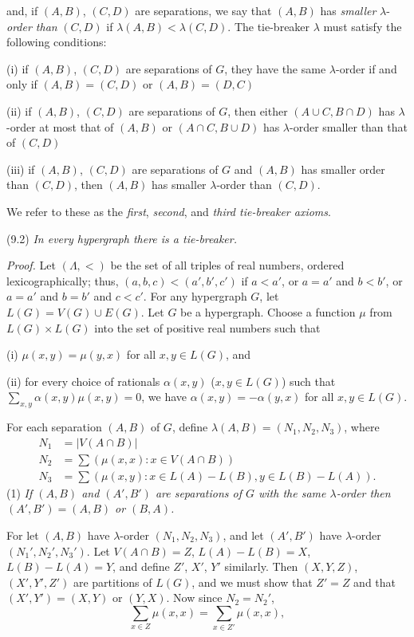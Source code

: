\noindent and, if $(A, B)$, $(C, D)$ are separations, we say that $(A, B)$ has \textit{smaller} $\lambda$-\textit{order than} $(C, D)$ if $\lambda(A, B) < \lambda(C, D)$. The tie-breaker $\lambda$ must satisfy the following conditions:

\hspace*{12pt}(i) if $(A, B)$, $(C, D)$ are separations of $G$, they have the same $\lambda$-order if and only if $(A, B) = (C, D)$ or $(A, B) = (D, C)$

\hspace*{12pt}(ii) if $(A, B)$, $(C, D)$ are separations of $G$, then either $(A \cup C, B \cap D)$ has $\lambda$-order at most that of $(A, B)$ or $(A \cap C, B \cup D)$ has $\lambda$-order smaller than that of $(C, D)$

\hspace*{12pt}(iii) if $(A, B)$, $(C, D)$ are separations of $G$ and $(A, B)$ has smaller order than $(C, D)$, then $(A, B)$ has smaller $\lambda$-order than $(C, D)$.

We refer to these as the \textit{first}, \textit{second}, and \textit{third tie-breaker axioms}.

\stmt
(9.2) \textit{In every hypergraph there is a tie-breaker.}

\textit{Proof.} Let $(\Lambda, <)$ be the set of all triples of real numbers, ordered lexicographically; thus, $(a, b, c) < (a', b', c')$ if $a < a'$, or $a = a'$ and $b < b'$, or $a = a'$ and $b = b'$ and $c < c'$. For any hypergraph $G$, let $L(G) = V(G) \cup E(G)$. Let $G$ be a hypergraph. Choose a function $\mu$ from $L(G) \times L(G)$ into the set of positive real numbers such that

\hspace*{12pt}(i) $\mu(x, y) = \mu(y, x)$ for all $x, y \in L(G)$, and

\hspace*{12pt}(ii) for every choice of rationals $\alpha(x, y)$ ($x, y \in L(G)$) such that $\sum_{x, y} \alpha(x, y) \mu(x, y) = 0$, we have $\alpha(x, y) = -\alpha(y, x)$ for all $x, y \in L(G)$.

For each separation $(A, B)$ of $G$, define $\lambda(A, B) = (N_1, N_2, N_3)$, where
\begin{align*}
N_1 &= |V(A \cap B)| \\
N_2 &= \sum (\mu(x, x) : x \in V(A \cap B)) \\
N_3 &= \sum (\mu(x, y) : x \in L(A) - L(B), y \in L(B) - L(A)).
\end{align*}
\hspace*{12pt}(1) \textit{If $(A, B)$ and $(A', B')$ are separations of $G$ with the same $\lambda$-order then $(A', B') = (A, B)$ or $(B, A)$.}

For let $(A, B)$ have $\lambda$-order $(N_1, N_2, N_3)$, and let $(A', B')$ have $\lambda$-order $(N_1', N_2', N_3')$. Let $V(A \cap B) = Z$, $L(A) - L(B) = X$, $L(B) - L(A) = Y$, and define $Z'$, $X'$, $Y'$ similarly. Then $(X, Y, Z)$, $(X', Y', Z')$ are partitions of $L(G)$, and we must show that $Z' = Z$ and that $(X', Y') = (X, Y)$ or $(Y, X)$. Now since $N_2 = N_2'$,
\begin{equation*}
\sum_{x \in Z} \mu(x, x) = \sum_{x \in Z'} \mu(x, x),
\end{equation*}
